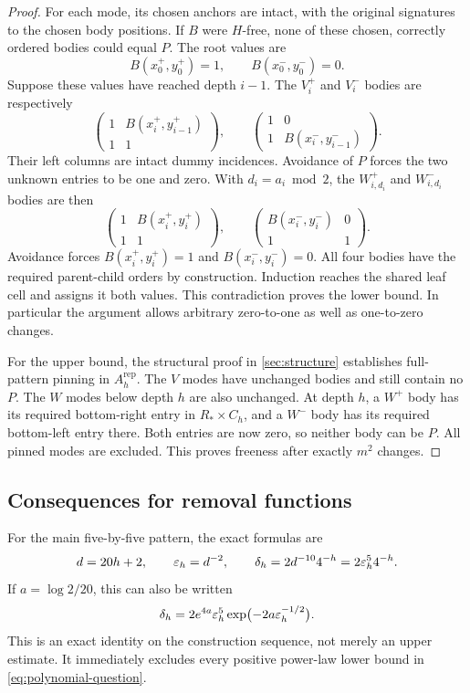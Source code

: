\begin{proof}
For each mode, its chosen anchors are intact, with the original
signatures to the chosen body positions. If \(B\) were \(H\)-free,
none of these chosen, correctly ordered bodies could equal \(P\).
The root values are
\[
 B(x_0^+,y_0^+)=1,\qquad B(x_0^-,y_0^-)=0.
\]
Suppose these values have reached depth \(i-1\). The \(V_i^+\) and
\(V_i^-\) bodies are respectively
\[
 \begin{pmatrix}1&B(x_i^+,y_{i-1}^+)\\1&1\end{pmatrix},
 \qquad
 \begin{pmatrix}1&0\\1&B(x_i^-,y_{i-1}^-)\end{pmatrix}.
\]
Their left columns are intact dummy incidences. Avoidance of \(P\)
forces the two unknown entries to be one and zero. With
\(d_i=a_i\bmod2\), the \(W_{i,d_i}^+\) and \(W_{i,d_i}^-\) bodies
are then
\[
 \begin{pmatrix}1&B(x_i^+,y_i^+)\\1&1\end{pmatrix},
 \qquad
 \begin{pmatrix}B(x_i^-,y_i^-)&0\\1&1\end{pmatrix}.
\]
Avoidance forces
\(B(x_i^+,y_i^+)=1\) and \(B(x_i^-,y_i^-)=0\).
All four bodies have the required parent-child orders by construction.
Induction reaches the shared leaf cell and assigns it both values.
This contradiction proves the lower bound. In particular the argument
allows arbitrary zero-to-one as well as one-to-zero changes.

For the upper bound, the structural proof in \cref{sec:structure}
establishes full-pattern pinning in \(A_h^{\mathrm{rep}}\).
The \(V\) modes have unchanged bodies and still contain no \(P\).
The \(W\) modes below depth \(h\) are also unchanged. At depth \(h\),
a \(W^+\) body has its required bottom-right entry in
\(R_*\times C_h\), and a \(W^-\) body has its required bottom-left
entry there. Both entries are now zero, so neither body can be \(P\).
All pinned modes are excluded. This proves freeness after exactly
\(m^2\) changes.
\end{proof}

\subsection{Consequences for removal functions}

For the main five-by-five pattern, the exact formulas are
\begin{equation}
 d=20h+2,\qquad \varepsilon_h=d^{-2},\qquad
 \delta_h=2d^{-10}4^{-h}=2\varepsilon_h^5 4^{-h}.
 \label{eq:five-density}
\end{equation}
If \(a=\log2/20\), this can also be written
\begin{equation}
 \delta_h=2e^{4a}\varepsilon_h^5
        \exp\bigl(-2a\varepsilon_h^{-1/2}\bigr).
 \label{eq:explicit-stretched}
\end{equation}
This is an exact identity on the construction sequence, not merely
an upper estimate. It immediately excludes every positive power-law
lower bound in \eqref{eq:polynomial-question}.

